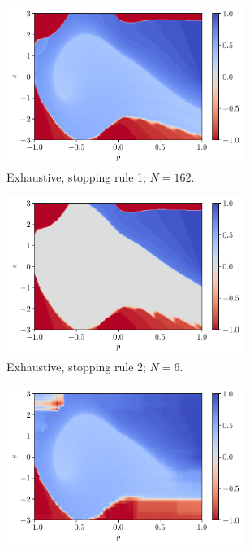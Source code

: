 \documentclass[a4paper, 12pt]{article}
\begin{document}
    \begin{figure}[H]
        \centering
        \begin{subfigure}{0.49\textwidth}
            \centering
            \includegraphics[width=0.85\textwidth]{resources/pdf/4_exhaustive_1_XRT_q_+4.pdf}
            \caption{Exhaustive, stopping rule 1; $N = 162$.}
            \vspace{0.5em}
        \end{subfigure}
        \hfill
        \begin{subfigure}{0.49\textwidth}
            \centering
            \includegraphics[width=0.85\textwidth]{resources/pdf/4_exhaustive_2_XRT_q_+4.pdf}
            \caption{Exhaustive, stopping rule 2; $N = 6$.}
            \vspace{0.5em}
        \end{subfigure}
        \begin{subfigure}{0.49\textwidth}
            \centering
            \includegraphics[width=0.85\textwidth]{resources/pdf/4_montecarlo_1_XRT_q_+4.pdf}

\end{subfigure}
\end{figure}
\end{document}
